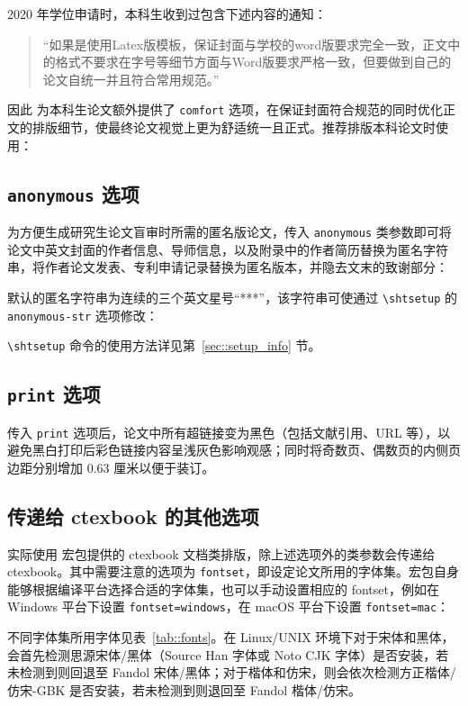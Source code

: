 \documentclass[bachelor, comfort]{shtthesis}
\begin{document}
2020 年学位申请时，本科生收到过包含下述内容的通知：
\begin{quotation}
\fangsong “如果是使用Latex版模板，保证封面与学校的word版要求完全一致，正文中的格式不要求在字号等细节方面与Word版要求严格一致，但要做到自己的论文自统一并且符合常用规范。”
\end{quotation}
因此 \shtthesis{} 为本科生论文额外提供了 \verb|comfort| 选项，在保证封面符合规范的同时优化正文的排版细节，使最终论文视觉上更为舒适统一且正式。推荐排版本科论文时使用：

\subsection{\texttt{anonymous} 选项} \label{sec::option_anonymous}
为方便生成研究生论文盲审时所需的匿名版论文，传入 \verb|anonymous| 类参数即可将论文中英文封面的作者信息、导师信息，以及附录中的作者简历替换为匿名字符串，将作者论文发表、专利申请记录替换为匿名版本，并隐去文末的致谢部分：
\shtthesis{} 默认的匿名字符串为连续的三个英文星号“***”，该字符串可使通过 \verb|\shtsetup| 的 \verb|anonymous-str| 选项修改：
\begin{latex}
\end{latex}
\verb|\shtsetup| 命令的使用方法详见第~\ref{sec::setup_info} 节。

\subsection{\texttt{print} 选项}
传入 \verb|print| 选项后，论文中所有超链接变为黑色（包括文献引用、URL 等），以避免黑白打印后彩色链接内容呈浅灰色影响观感；同时将奇数页、偶数页的内侧页边距分别增加 0.63 厘米以便于装订。

\subsection{传递给 \textsf{ctexbook} 的其他选项}
\shtthesis{} 实际使用 \CTeX 宏包提供的 \textsf{ctexbook} 文档类排版，除上述选项外的类参数会传递给 \textsf{ctexbook}。其中需要注意的选项为 \verb|fontset|，即设定论文所用的字体集。\CTeX 宏包自身能够根据编译平台选择合适的字体集，也可以手动设置相应的 fontset，例如在 Windows 平台下设置 \verb|fontset=windows|，在 macOS 平台下设置 \verb|fontset=mac|：
不同字体集所用字体见表~\ref{tab::fonts}。在 Linux/UNIX 环境下对于宋体和黑体，会首先检测思源宋体/黑体（Source Han 字体或 Noto CJK 字体）是否安装，若未检测到则回退至 Fandol 宋体/黑体；对于楷体和仿宋，则会依次检测方正楷体/仿宋-GBK 是否安装，若未检测到则退回至 Fandol 楷体/仿宋。
\end{document}
